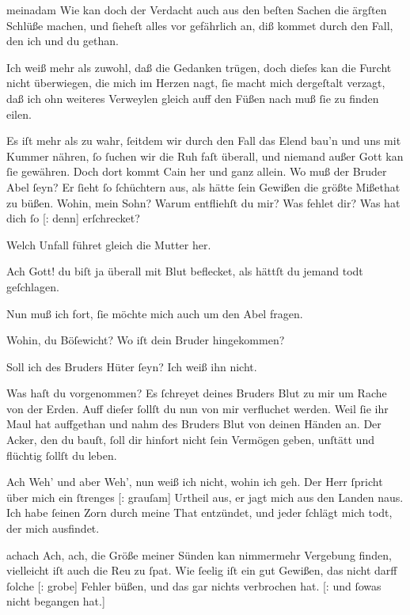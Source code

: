 \documentclass[tocstyle=ref-genre]{ees}
\begin{document}
{\begin{movement}{meinadam}
  \voice[Eva]
  Wie kan doch der Verdacht auch aus den beſten Sachen
  die ärgſten Schlüße machen,
  und ſieheſt alles vor gefährlich an,
  diß kommet durch den Fall, den ich und du gethan.

  \voice[Adam]
  Ich weiß mehr als zuwohl, daß die Gedanken trügen,
  doch dieſes kan die Furcht nicht überwiegen,
  die mich im Herzen nagt,
  ſie macht mich dergeſtalt verzagt,
  daß ich ohn weiteres Verweylen
  gleich auff den Füßen nach muß ſie zu finden eilen.

  \voice[Eva]
  Es iſt mehr als zu wahr, ſeitdem wir durch den Fall
  das Elend bau’n und uns mit Kummer nähren,
  ſo ſuchen wir die Ruh faſt überall,
  und niemand außer Gott kan ſie gewähren.
  Doch dort kommt Cain her und ganz allein.
  Wo muß der Bruder Abel ſeyn?
  Er ſieht ſo ſchüchtern aus, als hätte ſein Gewißen
  die größte Mißethat zu büßen.
  Wohin, mein Sohn? Warum entfliehſt du mir?
  Was fehlet dir?
  Was hat dich ſo [: denn] erſchrecket?

  \voice[Cain]
  Welch Unfall führet gleich die Mutter her.

  \voice[Eva]
  Ach Gott! du biſt ja überall mit Blut beflecket,
  als hättſt du jemand todt geſchlagen.

  \voice[Cain]
  Nun muß ich fort, ſie möchte mich
  auch um den Abel fragen.

  Wohin, du Böſewicht?
  Wo iſt dein Bruder hingekommen?

  \voice[Cain]
  Soll ich des Bruders Hüter ſeyn? Ich weiß ihn nicht.

  Was haſt du vorgenommen?
  Es ſchreyet deines Bruders Blut
  zu mir um Rache von der Erden.
  Auff dieſer ſollſt du nun von mir verfluchet werden.
  Weil ſie ihr Maul hat auffgethan
  und nahm des Bruders Blut von deinen Händen an.
  Der Acker, den du bauſt,
  ſoll dir hinfort nicht ſein Vermögen geben,
  unſtätt und flüchtig ſollſt du leben.

  \voice[Cain]
  Ach Weh’ und aber Weh’,
  nun weiß ich nicht, wohin ich geh.
  Der Herr ſpricht über mich ein ſtrenges [: grauſam] Urtheil aus,
  er jagt mich aus den Landen naus.
  Ich habe ſeinen Zorn durch meine That entzündet,
  und jeder ſchlägt mich todt, der mich ausfindet.
\end{movement}

\begin{movement}{achach}
  \voice[Cain]
  Ach, ach, die Größe meiner Sünden
  kan nimmermehr Vergebung finden,
  vielleicht iſt auch die Reu zu ſpat.
  Wie ſeelig iſt ein gut Gewißen,
  das nicht darff ſolche [: grobe] Fehler büßen,
  und das gar nichts verbrochen hat.
  [: und ſowas nicht begangen hat.]
\end{movement}

}
\end{document}
